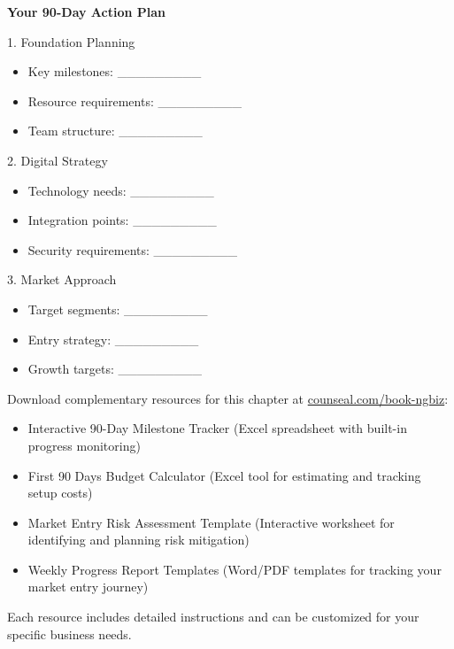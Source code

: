 \begin{workshopbox}
\textbf{Your 90-Day Action Plan}

1. Foundation Planning
\begin{itemize}
    \item Key milestones: \_\_\_\_\_\_\_\_\_
    \item Resource requirements: \_\_\_\_\_\_\_\_\_
    \item Team structure: \_\_\_\_\_\_\_\_\_
\end{itemize}

2. Digital Strategy
\begin{itemize}
    \item Technology needs: \_\_\_\_\_\_\_\_\_
    \item Integration points: \_\_\_\_\_\_\_\_\_
    \item Security requirements: \_\_\_\_\_\_\_\_\_
\end{itemize}

3. Market Approach
\begin{itemize}
    \item Target segments: \_\_\_\_\_\_\_\_\_
    \item Entry strategy: \_\_\_\_\_\_\_\_\_
    \item Growth targets: \_\_\_\_\_\_\_\_\_
\end{itemize}
\end{workshopbox}

\begin{communitybox}
    Download complementary resources for this chapter at \href{https://viz.li/csl-book-ngbiz}{counseal.com/book-ngbiz}:
\begin{itemize}
    \item Interactive 90-Day Milestone Tracker (Excel spreadsheet with built-in progress monitoring)
    \item First 90 Days Budget Calculator (Excel tool for estimating and tracking setup costs)
    \item Market Entry Risk Assessment Template (Interactive worksheet for identifying and planning risk mitigation)
    \item Weekly Progress Report Templates (Word/PDF templates for tracking your market entry journey)
\end{itemize}

Each resource includes detailed instructions and can be customized for your specific business needs.
\end{communitybox}

